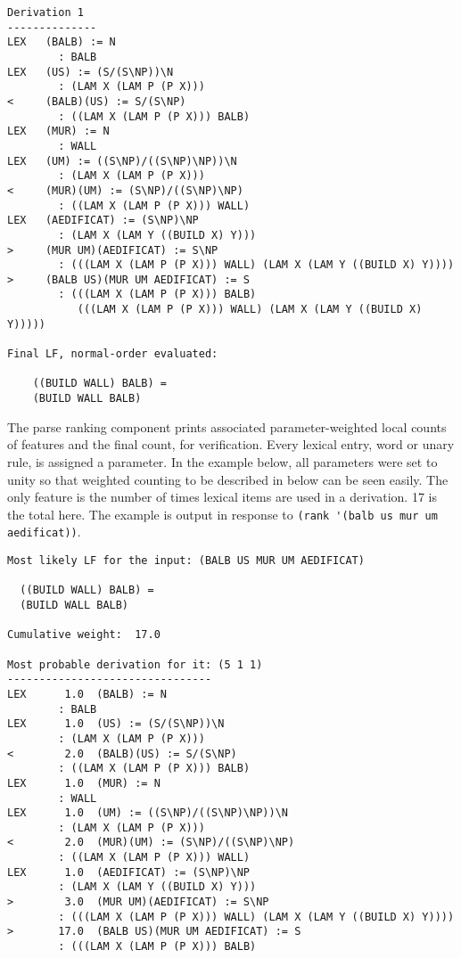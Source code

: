 \documentclass[11pt]{article}
\begin{document}
{\scriptsize
\begin{verbatim}
Derivation 1
--------------
LEX   (BALB) := N
        : BALB
LEX   (US) := (S/(S\NP))\N
        : (LAM X (LAM P (P X)))
<     (BALB)(US) := S/(S\NP)
        : ((LAM X (LAM P (P X))) BALB)
LEX   (MUR) := N
        : WALL
LEX   (UM) := ((S\NP)/((S\NP)\NP))\N
        : (LAM X (LAM P (P X)))
<     (MUR)(UM) := (S\NP)/((S\NP)\NP)
        : ((LAM X (LAM P (P X))) WALL)
LEX   (AEDIFICAT) := (S\NP)\NP
        : (LAM X (LAM Y ((BUILD X) Y)))
>     (MUR UM)(AEDIFICAT) := S\NP
        : (((LAM X (LAM P (P X))) WALL) (LAM X (LAM Y ((BUILD X) Y))))
>     (BALB US)(MUR UM AEDIFICAT) := S
        : (((LAM X (LAM P (P X))) BALB)
           (((LAM X (LAM P (P X))) WALL) (LAM X (LAM Y ((BUILD X) Y)))))

Final LF, normal-order evaluated:

    ((BUILD WALL) BALB) =
    (BUILD WALL BALB)
\end{verbatim}}

\noindent The parse ranking component prints associated parameter-weighted local counts of features and the final count, for verification. Every lexical entry, word or unary rule, is assigned a parameter.
In the example below, all parameters were set to unity so that weighted counting to be described in below can be seen easily. The only feature is the number of times lexical items are used in a derivation. 17 is the total here.
The example is output in response to \verb+(rank '(balb us mur um aedificat))+.

{\scriptsize
\begin{verbatim}
Most likely LF for the input: (BALB US MUR UM AEDIFICAT)

  ((BUILD WALL) BALB) =
  (BUILD WALL BALB)

Cumulative weight:  17.0

Most probable derivation for it: (5 1 1)
--------------------------------
LEX      1.0  (BALB) := N
        : BALB
LEX      1.0  (US) := (S/(S\NP))\N
        : (LAM X (LAM P (P X)))
<        2.0  (BALB)(US) := S/(S\NP)
        : ((LAM X (LAM P (P X))) BALB)
LEX      1.0  (MUR) := N
        : WALL
LEX      1.0  (UM) := ((S\NP)/((S\NP)\NP))\N
        : (LAM X (LAM P (P X)))
<        2.0  (MUR)(UM) := (S\NP)/((S\NP)\NP)
        : ((LAM X (LAM P (P X))) WALL)
LEX      1.0  (AEDIFICAT) := (S\NP)\NP
        : (LAM X (LAM Y ((BUILD X) Y)))
>        3.0  (MUR UM)(AEDIFICAT) := S\NP
        : (((LAM X (LAM P (P X))) WALL) (LAM X (LAM Y ((BUILD X) Y))))
>       17.0  (BALB US)(MUR UM AEDIFICAT) := S
        : (((LAM X (LAM P (P X))) BALB)
\end{verbatim}}
\end{document}

